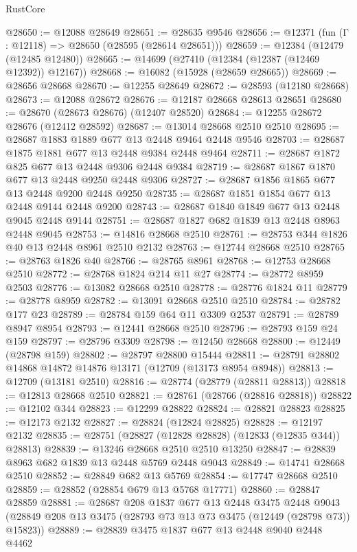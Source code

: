 \begin{lexlean}{RustCore}
\begin{coremodule}
@28650 := @12088 @28649
@28651 := @28635 @9546
@28656 := @12371 (fun (Γ : @12118) => @28650 (@28595 (@28614 @28651)))
@28659 := @12384 (@12479 (@12485 @12480))
@28665 := @14699 (@27410 (@12384 (@12387 (@12469 @12392)) @12167))
@28668 := @16082 (@15928 (@28659 @28665))
@28669 := @28656 @28668
@28670 := @12255 @28649
@28672 := @28593 (@12180 @28668)
@28673 := @12088 @28672
@28676 := @12187 @28668 @28613 @28651
@28680 := @28670 (@28673 @28676) (@12407 @28520)
@28684 := @12255 @28672 @28676 (@12412 @28592)
@28687 := @13014 @28668 @2510 @2510
@28695 := @28687 @1883 @1889 @677 @13 @2448 @9464 @2448 @9546
@28703 := @28687 @1875 @1881 @677 @13 @2448 @9384 @2448 @9464
@28711 := @28687 @1872 @825 @677 @13 @2448 @9306 @2448 @9384
@28719 := @28687 @1867 @1870 @677 @13 @2448 @9250 @2448 @9306
@28727 := @28687 @1856 @1865 @677 @13 @2448 @9200 @2448 @9250
@28735 := @28687 @1851 @1854 @677 @13 @2448 @9144 @2448 @9200
@28743 := @28687 @1840 @1849 @677 @13 @2448 @9045 @2448 @9144
@28751 := @28687 @1827 @682 @1839 @13 @2448 @8963 @2448 @9045
@28753 := @14816 @28668 @2510
@28761 := @28753 @344 @1826 @40 @13 @2448 @8961 @2510 @2132
@28763 := @12744 @28668 @2510
@28765 := @28763 @1826 @40
@28766 := @28765 @8961
@28768 := @12753 @28668 @2510
@28772 := @28768 @1824 @214 @11 @27
@28774 := @28772 @8959 @2503
@28776 := @13082 @28668 @2510
@28778 := @28776 @1824 @11
@28779 := @28778 @8959
@28782 := @13091 @28668 @2510 @2510
@28784 := @28782 @177 @23
@28789 := @28784 @159 @64 @11 @3309 @2537
@28791 := @28789 @8947 @8954
@28793 := @12441 @28668 @2510
@28796 := @28793 @159 @24 @159
@28797 := @28796 @3309
@28798 := @12450 @28668
@28800 := @12449 (@28798 @159)
@28802 := @28797 @28800 @15444
@28811 := @28791 @28802 @14868 @14872 @14876 @13171 (@12709 (@13173 @8954 @8948))
@28813 := @12709 (@13181 @2510)
@28816 := @28774 (@28779 (@28811 @28813))
@28818 := @12813 @28668 @2510
@28821 := @28761 (@28766 (@28816 @28818))
@28822 := @12102 @344
@28823 := @12299 @28822
@28824 := @28821 @28823
@28825 := @12173 @2132
@28827 := @28824 (@12824 @28825)
@28828 := @12197 @2132
@28835 := @28751 (@28827 (@12828 @28828) (@12833 (@12835 @344)) @28813)
@28839 := @13246 @28668 @2510 @2510 @13250
@28847 := @28839 @8963 @682 @1839 @13 @2448 @5769 @2448 @9043
@28849 := @14741 @28668 @2510
@28852 := @28849 @682 @13 @5769
@28854 := @17747 @28668 @2510
@28859 := @28852 (@28854 @679 @13 @5768 @17771)
@28860 := @28847 @28859
@28881 := @28687
    @208
    @1837
    @677
    @13
    @2448
    @3475
    @2448
    @9043
    (@28849 @208 @13 @3475 (@28793 @73 @13 @73 @3475 (@12449 (@28798 @73)) @15823))
@28889 := @28839 @3475 @1837 @677 @13 @2448 @9040 @2448 @4462

\end{coremodule}
\end{lexlean}
